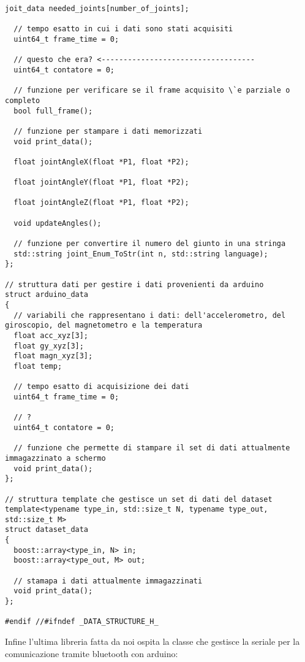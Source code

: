 \documentclass[10pt,a4paper]{article}
\begin{document}
\begin{lstlisting}[style=mycpp, caption=librerie usate, captionpos=b]
  joit_data needed_joints[number_of_joints];

  // tempo esatto in cui i dati sono stati acquisiti
  uint64_t frame_time = 0;

  // questo che era? <-----------------------------------
  uint64_t contatore = 0;

  // funzione per verificare se il frame acquisito \`e parziale o completo 
  bool full_frame();

  // funzione per stampare i dati memorizzati
  void print_data();

  float jointAngleX(float *P1, float *P2);

  float jointAngleY(float *P1, float *P2);

  float jointAngleZ(float *P1, float *P2);

  void updateAngles();

  // funzione per convertire il numero del giunto in una stringa
  std::string joint_Enum_ToStr(int n, std::string language);
};

// struttura dati per gestire i dati provenienti da arduino
struct arduino_data
{
  // variabili che rappresentano i dati: dell'accelerometro, del giroscopio, del magnetometro e la temperatura
  float acc_xyz[3];
  float gy_xyz[3];
  float magn_xyz[3];
  float temp;

  // tempo esatto di acquisizione dei dati
  uint64_t frame_time = 0;

  // ?
  uint64_t contatore = 0;

  // funzione che permette di stampare il set di dati attualmente immagazzinato a schermo 
  void print_data();
};

// struttura template che gestisce un set di dati del dataset
template<typename type_in, std::size_t N, typename type_out, std::size_t M>
struct dataset_data
{
  boost::array<type_in, N> in;
  boost::array<type_out, M> out;

  // stamapa i dati attualmente immagazzinati
  void print_data();
};

#endif //#ifndef _DATA_STRUCTURE_H_
\end{lstlisting}
%
%
Infine l'ultima libreria fatta da noi ospita la classe che gestisce la seriale per la comunicazione tramite bluetooth con arduino:
\end{document}
